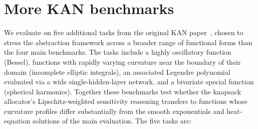 \section{More KAN benchmarks}\label{app:more-benchmarks}

We evaluate on five additional tasks from the original KAN paper~\cite{Liu+Others/2025/KAN}, chosen to stress the abstraction framework across a broader range of functional forms than the four main benchmarks. The tasks include a highly oscillatory function (Bessel), functions with rapidly varying curvature near the boundary of their domain (incomplete elliptic integrals), an associated Legendre polynomial evaluated via a wide single-hidden-layer network, and a bivariate special function (spherical harmonics). Together these benchmarks test whether the knapsack allocator's Lipschitz-weighted sensitivity reasoning transfers to functions whose curvature profiles differ substantially from the smooth exponentials and heat-equation solutions of the main evaluation. The five tasks are:

